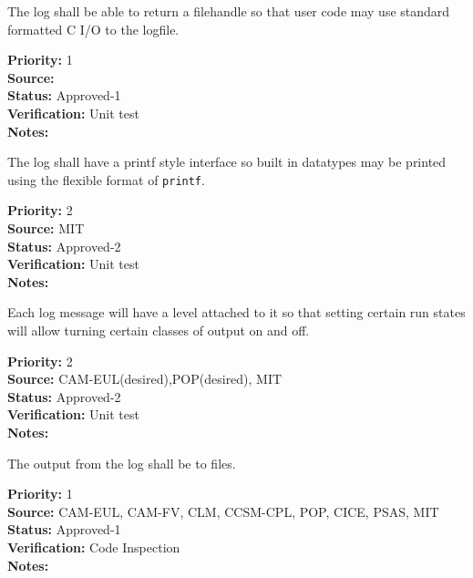 
The log shall be able to return a filehandle so that user code may use
standard formatted C I/O to the logfile.

\begin{reqlist}
{\bf Priority:} 1 \\
{\bf Source:} \\
{\bf Status:} Approved-1 \\
{\bf Verification:} Unit test \\
{\bf Notes:} 
\end{reqlist}


The log shall have a printf style interface so built in datatypes may be
printed using the flexible format of {\tt printf}.

\begin{reqlist}
{\bf Priority:} 2 \\
{\bf Source:} MIT \\
{\bf Status:} Approved-2 \\
{\bf Verification:} Unit test \\
{\bf Notes:} 
\end{reqlist}

Each log message will have a level attached to it so that setting certain run
states will allow turning certain classes of output on and off.

\begin{reqlist}
{\bf Priority:} 2\\
{\bf Source:} CAM-EUL(desired),POP(desired), MIT \\
{\bf Status:} Approved-2 \\
{\bf Verification:} Unit test \\
{\bf Notes:} 
\end{reqlist}

The output from the log shall be to files.

\begin{reqlist}
{\bf Priority:} 1 \\
{\bf Source:} CAM-EUL, CAM-FV, CLM, CCSM-CPL, POP, CICE, PSAS, MIT  \\
{\bf Status:} Approved-1 \\
{\bf Verification:} Code Inspection \\
{\bf Notes:} 
\end{reqlist}

